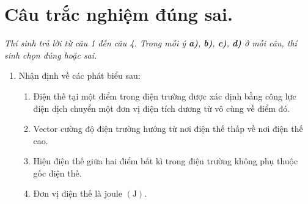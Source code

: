 \section{Câu trắc nghiệm đúng sai.} 
\textit{Thí sinh trả lời từ câu 1 đến câu 4. Trong mỗi ý \textbf{a)}, \textbf{b)}, \textbf{c)}, \textbf{d)} ở mỗi câu, thí sinh chọn đúng hoặc sai.}
\begin{enumerate}[label=\bfseries Câu \arabic*:]
	\item Nhận định về các phát biểu sau:
	\begin{enumerate}[label=\bfseries \alph*)]
		\item Điện thế tại một điểm trong điện trường được xác định bằng công lực điện dịch chuyển một đơn vị điện tích dương từ vô cùng về điểm đó.
		\item Vector cường độ điện trường hướng từ nơi điện thế thấp về nơi điện thế cao.
		\item Hiệu điện thế giữa hai điểm bất kì trong điện trường không phụ thuộc gốc điện thế.
		\item Đơn vị điện thế là joule $\left(\si{\joule}\right)$.
	\end{enumerate}
 

\end{enumerate}
